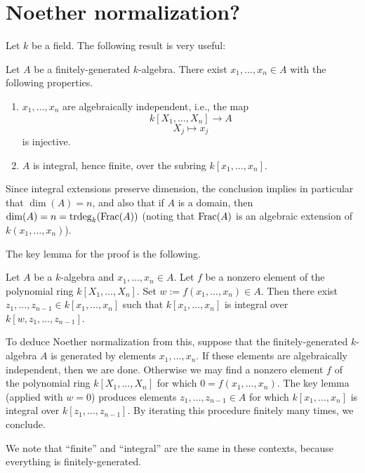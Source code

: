 \documentclass[reqno]{amsart}
\DeclareMathOperator{\trdeg}{trdeg}
\begin{document}
\section{Noether normalization?}
\label{sec:orgae6adf2}

Let \(k\) be a field.
The following result is very useful:
\begin{theorem}
  Let $A$ be a finitely-generated $k$-algebra.
  There exist
  $x_1,\dotsc,x_n \in A$ with the following properties.
  \begin{enumerate}
  \item $x_1,\dotsc,x_n$ are algebraically independent,
    i.e.,
    the map
    \[
      k[X_1,\dotsc,X_n] \rightarrow A
    \]
    \[
      X_j \mapsto x_j
    \]
    is injective.
  \item
    $A$ is integral, hence finite, over the subring
    $k[x_1,\dotsc,x_n]$.
  \end{enumerate}
\end{theorem}
Since integral extensions preserve
dimension,
the conclusion implies in particular
that \(\dim(A) = n\),
and also that if \(A\) is a domain,
then \(\dim(A) = n = \trdeg_k(\Frac(A))\)
(noting that \(\operatorname{Frac}(A)\) is an algebraic extension of \(k(x_1,\dotsc,x_n)\)).

The key lemma for the proof is the following.
\begin{lemma}
  Let $A$ be a $k$-algebra
  and $x_1,\dotsc,x_n \in A$.
  Let $f$ be a nonzero element
  of the polynomial ring
  $k[X_1,\dotsc,X_n]$.
  Set $w := f(x_1,\dotsc,x_n) \in A$.
  Then
  there exist $z_1,\dotsc,z_{n-1} \in k[x_1,\dotsc,x_n]$
  such that
  $k[x_1,\dotsc,x_n]$ is integral over $k[w,z_1,\dotsc,z_{n-1}]$.
\end{lemma}

To deduce Noether normalization from this,
suppose that the finitely-generated $k$-algebra \(A\) is
generated by elements \(x_1,\dotsc,x_n\).
If these elements are algebraically independent,
then we are done.
Otherwise we may find a nonzero element \(f\) of the polynomial
ring \(k[X_1,\dotsc,X_n]\)
for which \(0 = f(x_1,\dotsc,x_n)\).
The key lemma (applied with \(w = 0\)) produces elements \(z_1,\dotsc,z_{n-1} \in A\)
for which \(k[x_1,\dotsc,x_n]\) is integral over
\(k[z_1,\dotsc,z_{n-1}]\).
By iterating this procedure finitely many times, we conclude.

We note that ``finite'' and ``integral'' are the same in these contexts,
because everything is finitely-generated.
\end{document}
